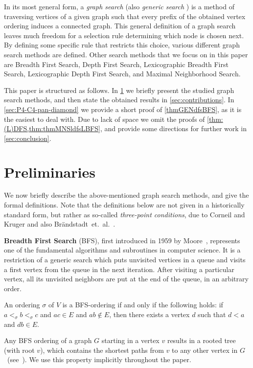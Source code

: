 \documentclass{svproc}
\begin{document}
In its most general form, a \emph{graph search} (also \emph{generic search} \cite{corneil2008unified}) is a method of traversing vertices of a given graph such that every prefix of the obtained vertex ordering induces a connected graph. 
This general definition of a graph search  leaves much freedom for a selection rule determining which node is chosen next. By defining some specific rule that restricts this choice, various different graph search methods are defined. Other search methods that we focus on in this paper are Breadth First Search, Depth First Search, Lexicographic Breadth First Search, Lexicographic Depth First Search, %
and Maximal Neighborhood Search.  

This paper is structured as follows. 
In  \cref{sec:prelims} we briefly present the studied graph search methods, and then state the obtained results in \cref{sec:contributions}.
In \cref{sec:P4-C4-pan-diamond} we 
provide a short proof of \cref{thmGENdfsBFS}, as it is the easiest to deal with.
Due to lack of space we omit the proofs of \cref{thm:(L)DFS,thm:thmMNSldfsLBFS}, and 
provide some directions for further work in \cref{sec:conclusion}.

\section{Preliminaries}\label{sec:prelims}
We now briefly describe the above-mentioned graph search methods, and give the formal definitions. 
Note that the definitions below are not given in 
a historically standard form, but rather as so-called \emph{three-point conditions}, due to Corneil and Kruger \cite{corneil2008unified} and also Br\" andstadt~et.~al.~\cite{MR1454439}.

\vspace{2.5mm}\noindent\textbf{Breadth First Search} (BFS), first introduced in 1959 by Moore~\cite{moore1959shortest}, 
\iflong
represents one of the fundamental algorithms and subroutines in computer science. It 
\fi
is a restriction of a generic search which puts unvisited vertices in a queue and visits a first vertex from the queue in the next iteration. After visiting a particular vertex, all its unvisited neighbors are put at the end of the queue, in an arbitrary order.
\begin{definition}
\label{thm:bfs-ordering-characterization}
An ordering $\sigma$ of $V$ is a BFS-ordering if and only if the following holds: if $ a <_\sigma b <_\sigma c$ and $ac \in E$ and $ab \notin E$, then there exists a vertex $d$ such that $d < a$ and $db \in E$. 
\end{definition}
Any BFS ordering of a graph $G$ starting in a vertex $v$ results in a rooted tree (with root $v$), which contains the shortest paths from $v$ to any other vertex in $G$~(see~\cite{even2011graph}). 
We use this property implicitly throughout the paper. 
\end{document}
